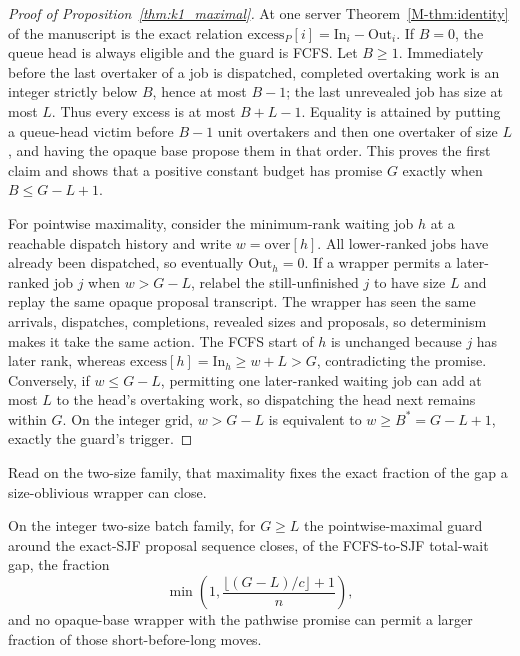 \documentclass[mathematics,supfile,submit,moreauthors]{Definitions/mdpi}
\begin{document}
\begin{proof}[Proof of Proposition~\ref{thm:k1_maximal}]
At one server Theorem~\ref*{M-thm:identity} of the manuscript is the exact relation
$\mathrm{excess}_P[i]=\mathrm{In}_i-\mathrm{Out}_i$. If $B=0$, the queue head
is always eligible and the guard is FCFS. Let $B\geq1$. Immediately before the last
overtaker of a job is dispatched, completed overtaking work is an integer
strictly below $B$, hence at most $B-1$; the last unrevealed job has size at most
$L$. Thus every excess is at most $B+L-1$. Equality is attained by putting a
queue-head victim before $B-1$ unit overtakers and then one overtaker of size
$L$, and having the opaque base propose them in that order. This proves the first
claim and shows that a positive constant budget has promise $G$ exactly when
$B\leq G-L+1$.

For pointwise maximality, consider the minimum-rank waiting job $h$ at a
reachable dispatch history and write $w=\mathrm{over}[h]$. All lower-ranked jobs
have already been dispatched, so eventually $\mathrm{Out}_h=0$. If a wrapper
permits a later-ranked job $j$ when $w>G-L$, relabel the still-unfinished $j$ to
have size $L$ and replay the same opaque proposal transcript. The wrapper has
seen the same arrivals, dispatches, completions, revealed sizes and proposals,
so determinism makes it take the same action. The FCFS start of $h$ is unchanged
because $j$ has later rank, whereas
$\mathrm{excess}[h]=\mathrm{In}_h\geq w+L>G$, contradicting the promise.
Conversely, if $w\leq G-L$, permitting one later-ranked waiting job can add at
most $L$ to the head's overtaking work, so dispatching the head next remains
within $G$. On the integer grid, $w>G-L$ is equivalent to
$w\geq B^*=G-L+1$, exactly the guard's trigger.
\end{proof}

Read on the two-size family, that maximality fixes the exact fraction of the gap a
size-oblivious wrapper can close.

\begin{proposition}
\label{cor:k1_frontier}
On the integer two-size batch family, for $G\geq L$ the pointwise-maximal guard
around the exact-SJF proposal sequence closes, of the FCFS-to-SJF total-wait gap,
the fraction
\[
 \min\!\left(1,\frac{\lfloor(G-L)/c\rfloor+1}{n}\right),
\]
and no opaque-base wrapper with the pathwise promise can permit a larger fraction
of those short-before-long moves.
\end{proposition}
\end{document}
